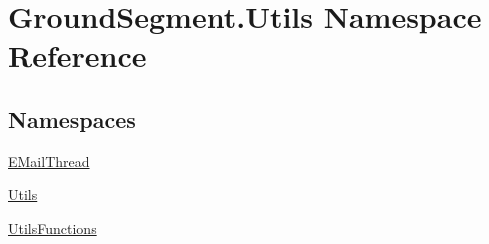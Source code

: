 \hypertarget{namespace_ground_segment_1_1_utils}{}\section{Ground\+Segment.\+Utils Namespace Reference}
\label{namespace_ground_segment_1_1_utils}
\subsection*{Namespaces}
\begin{DoxyCompactItemize}
\item 
 \hyperlink{namespace_ground_segment_1_1_utils_1_1_e_mail_thread}{E\+Mail\+Thread}
\item 
 \hyperlink{namespace_ground_segment_1_1_utils_1_1_utils}{Utils}
\item 
 \hyperlink{namespace_ground_segment_1_1_utils_1_1_utils_functions}{Utils\+Functions}
\end{DoxyCompactItemize}

